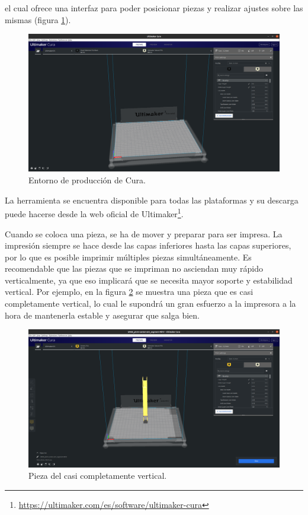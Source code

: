 el cual ofrece una interfaz para poder posicionar piezas y realizar ajustes sobre
las mismas (figura \ref{fig:cura_gui}).

\begin{figure}[H]
    \centering
    \includegraphics[width=.9\linewidth]{pictures/cura_ui.png}
    \caption{Entorno de producción de Cura.}
    \label{fig:cura_gui}
\end{figure}

La herramienta se encuentra disponible para todas las plataformas y su descarga
puede hacerse desde la web oficial de Ultimaker\footnote{\url{https://ultimaker.com/es/software/ultimaker-cura}}.

Cuando se coloca una pieza, se ha de mover y preparar para ser impresa. La impresión
siempre se hace desde las capas inferiores hasta las capas superiores, por lo que es
posible imprimir múltiples piezas simultáneamente. Es recomendable que las piezas que
se impriman no asciendan muy rápido verticalmente, ya que eso implicará que se necesita
mayor soporte y estabilidad vertical. Por ejemplo, en la figura \ref{fig:vpiece_1} se
muestra una pieza que es casi completamente vertical, lo cual le supondrá un gran
esfuerzo a la impresora a la hora de mantenerla estable y asegurar que salga bien.

\begin{figure}[H]
    \centering
    \includegraphics[width=.7\linewidth]{pictures/vertical_piece1.png}
    \caption{Pieza del \pArm{} casi completamente vertical.}
    \label{fig:vpiece_1}
\end{figure}

